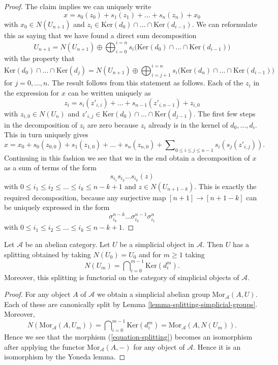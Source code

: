 \begin{proof}
\medskip\noindent
The claim implies we can uniquely write
$$
x = s_0(z_0) + s_1(z_1) + \ldots + s_n(z_n) + x_0
$$
with $x_0 \in N(U_{n + 1})$ and
$z_i \in \text{Ker}(d_0) \cap \ldots \cap \text{Ker}(d_{i - 1})$.
We can reformulate this as saying that we have found a direct
sum decomposition
$$
U_{n + 1}
=
N(U_{n + 1})
\oplus
\bigoplus\nolimits_{i = 0}^{i = n}
s_i\Big(\text{Ker}(d_0) \cap \ldots \cap \text{Ker}(d_{i - 1})\Big)
$$
with the property that
$$
\text{Ker}(d_0) \cap \ldots \cap \text{Ker}(d_j)
=
N(U_{n + 1}) \oplus
\bigoplus\nolimits_{i = j + 1}^{i = n}
s_i\Big(\text{Ker}(d_n) \cap \ldots \cap \text{Ker}(d_{i - 1})\Big)
$$
for $j = 0, \ldots, n$.
The result follows from this statement as follows.
Each of the $z_i$ in the expression for $x$
can be written uniquely as
$$
z_i = s_i(z'_{i, i}) + \ldots + s_{n - 1}(z'_{i, n - 1}) + z_{i, 0}
$$
with $z_{i, 0} \in N(U_n)$ and
$z'_{i, j} \in \text{Ker}(d_0) \cap \ldots \cap \text{Ker}(d_{j - 1})$.
The first few steps in the decomposition of $z_i$ are zero because
$z_i$ already is in the kernel of $d_0, \ldots, d_i$.
This in turn uniquely gives
$$
x = x_0 + s_0(z_{0, 0}) + s_1(z_{1, 0}) + \ldots + s_n(z_{n, 0}) +
\sum\nolimits_{0 \leq i \leq j \leq n - 1} s_i(s_j(z'_{i, j})).
$$
Continuing in this fashion we see that we in the end obtain
a decomposition of $x$ as a sum of terms
of the form
$$
s_{i_1} s_{i_2} \ldots s_{i_k} (z)
$$
with $0 \leq i_1 \leq i_2 \leq \ldots \leq i_k \leq n - k + 1$ and
$z \in N(U_{n + 1 - k})$. This is exactly the required
decomposition, because any surjective map $[n + 1] \to [n + 1 - k]$
can be uniquely expressed in the form
$$
\sigma^{n - k}_{i_k} \ldots \sigma^{n - 1}_{i_2} \sigma^n_{i_1}
$$
with $0 \leq i_1 \leq i_2 \leq \ldots \leq i_k \leq n - k + 1$.
\end{proof}

\begin{lemma}
\label{lemma-splitting-abelian-category}
Let $\mathcal{A}$ be an abelian category.
Let $U$ be a simplicial object in $\mathcal{A}$.
Then $U$ has a splitting obtained by taking $N(U_0) = U_0$ and
for $m \geq 1$ taking
$$
N(U_m) = \bigcap\nolimits_{i = 0}^{m - 1} \text{Ker}(d^m_i).
$$
Moreover, this splitting is functorial on the category of
simplicial objects of $\mathcal{A}$.
\end{lemma}

\begin{proof}
For any object $A$ of $\mathcal{A}$ we obtain
a simplicial abelian group $\text{Mor}_\mathcal{A}(A, U)$.
Each of these are canonically split by Lemma
\ref{lemma-splitting-simplicial-groups}. Moreover,
$$
N(\text{Mor}_\mathcal{A}(A, U_m)) =
\bigcap\nolimits_{i = 0}^{m - 1} \text{Ker}(d^m_i) =
\text{Mor}_\mathcal{A}(A, N(U_m)).
$$
Hence we see that the morphism (\ref{equation-splitting})
becomes an isomorphism after applying the functor
$\text{Mor}_\mathcal{A}(A, -)$ for any object of $\mathcal{A}$.
Hence it is an isomorphism by the Yoneda lemma.
\end{proof}

